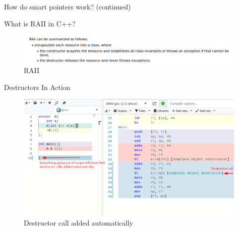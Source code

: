 \documentclass[
  10pt,
  ignorenonframetext,
]{beamer}
\begin{document}
\begin{frame}{How do smart pointers work?
(continued)}
\protect\hypertarget{how-do-smart-pointers-work-continued}{}
\begin{block}{What is RAII in C++?}
\protect\hypertarget{what-is-raii-in-c}{}
\begin{figure}
\centering
\includegraphics{images/raii.png}
\caption{RAII}
\end{figure}
\end{block}
\end{frame}

\begin{frame}{Destructors In Action}
\protect\hypertarget{destructors-in-action}{}
\begin{figure}
\centering
\includegraphics{images/./destructor.png}
\caption{Destructor call added automatically}
\end{figure}
\end{frame}
\end{document}
